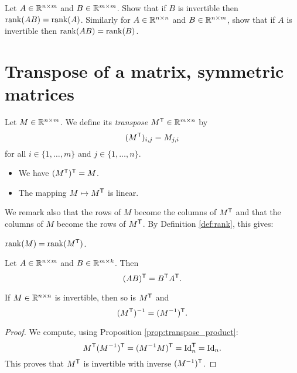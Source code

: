 \documentclass[11pt,nocut]{article}
\begin{document}
\begin{exercise}
	Let $A \in \mathbb{R}^{n \times m}$ and $B \in \mathbb{R}^{m \times m}$. Show that if $B$ is invertible then ${{\rm rank}}(AB) = {{\rm rank}}(A)$.
	Similarly for $A \in \mathbb{R}^{n \times n}$ and $B \in \mathbb{R}^{n \times m}$, show that if $A$ is invertible then ${{\rm rank}}(AB) = {{\rm rank}}(B)$.
\end{exercise}


\section{Transpose of a matrix, symmetric matrices}

\begin{definition}[Transpose]
	Let $M \in \mathbb{R}^{n \times m}$. We define its \emph{transpose} $M^{{\sf T}} \in \mathbb{R}^{m \times n}$ by
	$$
	(M^{{\sf T}})_{i,j} = M_{j,i}
	$$
	for all $i \in \{1, \dots, m\}$ and $j \in \{1, \dots, n\}$.
\end{definition}

\begin{remark}
	\leavevmode
	\begin{itemize}
		\item We have $(M^{{\sf T}})^{{\sf T}} = M$. 
		\item The mapping $M \mapsto M^{{\sf T}}$ is linear.
	\end{itemize}
\end{remark}

We remark also that the rows of $M$ become the columns of $M^{{\sf T}}$ and that the columns of $M$ become the rows of $M^{{\sf T}}$. By Definition \ref{def:rank}, this gives:
\begin{proposition}
	${{\rm rank}}(M) = {{\rm rank}}(M^{{\sf T}})$.
\end{proposition}

\begin{proposition}\label{prop:transpose_product}
	Let $A \in \mathbb{R}^{n \times m}$ and $B \in \mathbb{R}^{m \times k}$. Then
	$$
	(AB)^{{\sf T}} = B^{{\sf T}} A^{{\sf T}}.
	$$
\end{proposition}

\begin{corollary}
	If $M \in \mathbb{R}^{n \times n}$ is invertible, then so is $M^{{\sf T}}$ and
	$$
	(M^{{\sf T}})^{-1} = (M^{-1})^{{\sf T}}.
	$$
\end{corollary}
\begin{proof}
	We compute, using Proposition \ref{prop:transpose_product}:
	$$
	M^{{\sf T}} (M^{-1})^{{\sf T}} = (M^{-1} M)^{{\sf T}} = {{\rm Id}}_n^{{\sf T}} = {{\rm Id}}_n.
	$$
	This proves that $M^{{\sf T}}$ is invertible with inverse $(M^{-1})^{{\sf T}}$.
\end{proof}
\end{document}
